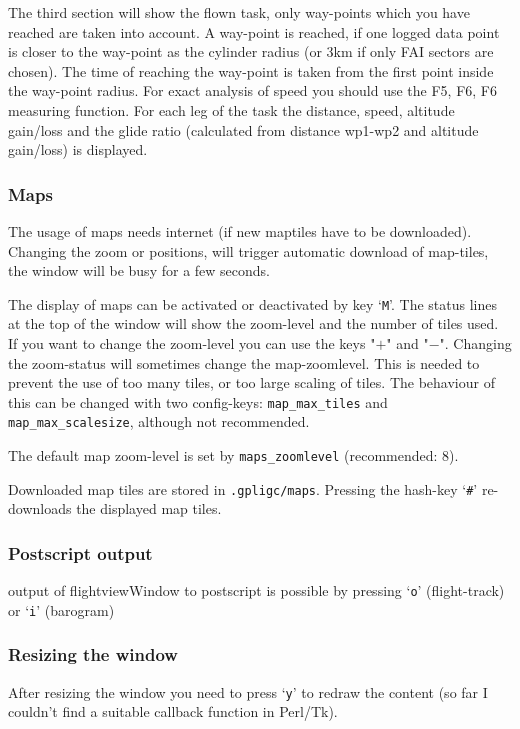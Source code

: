 The third section will show the flown task, only way-points which you have reached are taken into account. A way-point is reached, if one logged data point is closer to the way-point as the cylinder radius (or 3km if only FAI sectors are chosen). The time of reaching the way-point is taken from the first point inside the way-point radius.
For exact analysis of speed you should use the F5, F6, F6 measuring function.
For each leg of the task the distance, speed, altitude gain/loss and the glide ratio (calculated from distance wp1-wp2 and altitude gain/loss) is displayed.


\subsubsection{Maps}
The usage of maps needs internet (if new maptiles have to be downloaded).
Changing the zoom or positions, will trigger automatic download of map-tiles, the window will be busy for a few seconds.

The display of maps can be activated or deactivated by key `\texttt{M}'. 
The status lines at the top of the window will show the zoom-level and the number of tiles used.
If you want to change the zoom-level you can use the keys "$+$" and "$-$".
Changing the zoom-status will sometimes change the map-zoomlevel. This is needed to prevent 
the use of too many tiles, or too large scaling of tiles.
The behaviour of this can be changed with two config-keys: 
\texttt{map\_max\_tiles}
and \texttt{map\_max\_scalesize}, although not recommended.

The default map zoom-level is set by \texttt{maps\_zoomlevel} (recommended: 8).

Downloaded map tiles are stored in \texttt{.gpligc/maps}. Pressing the hash-key `\texttt{\#}' re-downloads the displayed map tiles.


\subsubsection{Postscript output}
output of flightviewWindow to postscript is possible by pressing `\texttt{o}' (flight-track)
or `\texttt{i}' (barogram)

\subsubsection{Resizing the window}
After resizing the window you need to press `\texttt{y}' to redraw the content (so far I couldn't find a suitable callback function in Perl/Tk).


